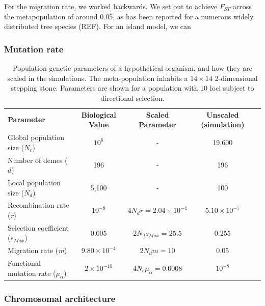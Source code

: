 \documentclass[11pt,twoside,lineno]{GSA_format}
\begin{document}
For the migration rate, we worked backwards. We set out to achieve $F_{ST}$ across the metapopulation of around 0.05, as has been reported for a numerous widely distributed tree species (REF). For an island model, we can 

\subsubsection{Mutation rate} 


\begin{table}[]
\label{SimulationParameters}
\caption{Population genetic parameters of a hypothetical organism, and how they are scaled in the simulations. The meta-population inhabits a $14\times14$ 2-dimensional stepping stone. Parameters are shown for a population with 10 loci subject to directional selection.}
\begin{tabular}{lcccl}
\cline{1-4}
\textbf{Parameter} & \textbf{Biological Value} & \textbf{Scaled Parameter}        & \textbf{Unscaled (simulation)} \\ \cline{1-4}
Global population size ($N_e$)                 & $10^6$                                      & -                           & 19,600                                              &           \\
Number of demes ($d$)                  & 196                                      & -                           & 196                                                &           \\
Local population size ($N_d$)                  & 5,100                                      & -                           & 100                                                &           \\
Recombination rate (\textit{r})                        & $10^{-8}$                                      & $4N_dr = 2.04 \times 10^{-4}$ & $5.10 \times 10^{-7}$                                           &           \\
Selection coefficient (\textit{$s_{Max}$})                        & 0.005                                         & $2N_ds_{Max}= 25.5$ & 0.255                                           &           \\
Migration rate (\textit{m})                        & $9.80\times 10^{-4}$                                      & $2N_dm = 10$        & 0.05                                               &           \\
Functional mutation rate (\textit{$\mu_\alpha$})                        & $2\times 10^{-10}$                                      & $4N_e\mu_\alpha = 0.0008$        & $10^{-8}$ &           \\ \cline{1-4}
\end{tabular}
\end{table}
\subsubsection{Chromosomal architecture}
\end{document}
